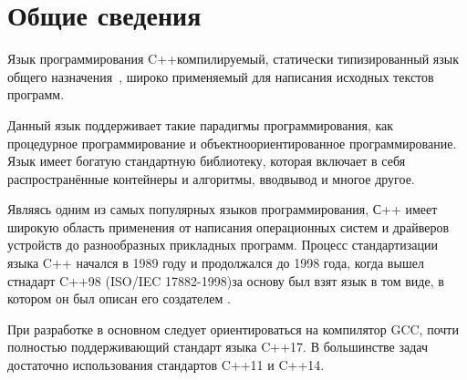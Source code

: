 \vspace{1cm}
\section{Общие сведения}

Язык программирования C++\mdash компилируемый, статически типизированный язык общего назначения~\cite{Страуструп}, широко применяемый для написания исходных текстов программ.

Данный язык поддерживает такие парадигмы программирования, как процедурное программирование и объектно\sdash ориентированное программирование. Язык имеет богатую стандартную библиотеку, которая включает в себя распространённые контейнеры и алгоритмы, ввод\sdash вывод и многое другое.

Являясь одним из самых популярных языков программирования, С++ имеет широкую область применения от написания операционных систем и драйверов устройств до разнообразных прикладных программ. Процесс стандартизации языка C++ начался в 1989 году и продолжался до 1998 года, когда вышел стнадарт C++98 (ISO/IEC 17882-1998)\mdash за основу был взят язык в том виде, в котором он был описан его создателем \cite{Страуструп,СтандартнаяБиблиотекаДляПрофессионалов}.

При разработке в основном следует ориентироваться на компилятор GCC, почти полностью поддерживающий стандарт языка C++17. В большинстве задач достаточно использования стандартов C++11 и C++14.  

